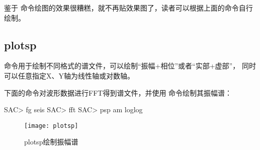 鉴于  命令绘图的效果很糟糕，就不再贴效果图了，读者可以根据上面的命令自行绘制。

\subsection{plotsp}
 命令用于绘制不同格式的谱文件，可以绘制``振幅+相位''或者``实部+虚部''，
同时可以任意指定X、Y轴为线性轴或对数轴。

下面的命令对波形数据进行FFT得到谱文件，并使用  命令绘制其振幅谱：
\begin{SACCode}
SAC> fg seis
SAC> fft
SAC> psp am loglog
\end{SACCode}

\begin{figure}[H]
\centering
\texttt{[image: plotsp]}
\caption{plotsp绘制振幅谱}
\label{fig:plotsp}
\end{figure}